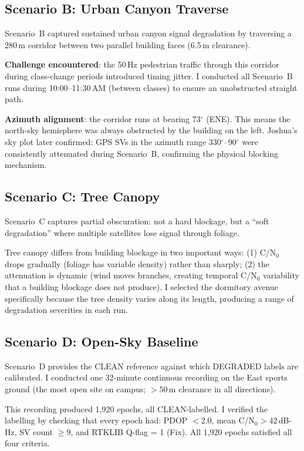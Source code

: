 \documentclass[12pt,a4paper]{article}
\begin{document}
\subsection{Scenario B: Urban Canyon Traverse}

Scenario~B captured sustained urban canyon signal degradation by traversing a 280\,m
corridor between two parallel building faces (6.5\,m clearance).

\textbf{Challenge encountered}: the 50\,Hz pedestrian traffic through this corridor
during class-change periods introduced timing jitter.
I conducted all Scenario~B runs during 10:00--11:30\,AM (between classes) to ensure
an unobstructed straight path.

\textbf{Azimuth alignment}: the corridor runs at bearing 73$^\circ$ (ENE).
This means the north-sky hemisphere was always obstructed by the building on the left.
Joshua's sky plot later confirmed: GPS SVs in the azimuth range 330$^\circ$--90$^\circ$
were consistently attenuated during Scenario~B, confirming the physical blocking
mechanism.

\subsection{Scenario C: Tree Canopy}

Scenario~C captures partial obscuration: not a hard blockage, but a ``soft degradation''
where multiple satellites lose signal through foliage.

Tree canopy differs from building blockage in two important ways:
(1) C/N$_0$ drops gradually (foliage has variable density) rather than sharply;
(2) the attenuation is dynamic (wind moves branches, creating temporal C/N$_0$ variability
  that a building blockage does not produce).
I selected the dormitory avenue specifically because the tree density varies along its
length, producing a range of degradation severities in each run.

\subsection{Scenario D: Open-Sky Baseline}

Scenario~D provides the CLEAN reference against which DEGRADED labels are calibrated.
I conducted one 32-minute continuous recording on the East sports ground
(the most open site on campus; $> 50$\,m clearance in all directions).

This recording produced 1,920 epochs, all CLEAN-labelled.
I verified the labelling by checking that every epoch had: PDOP $< 2.0$,
mean C/N$_0 > 42$\,dB-Hz, SV count $\geq 9$, and RTKLIB Q-flag = 1 (Fix).
All 1,920 epochs satisfied all four criteria.
\end{document}
